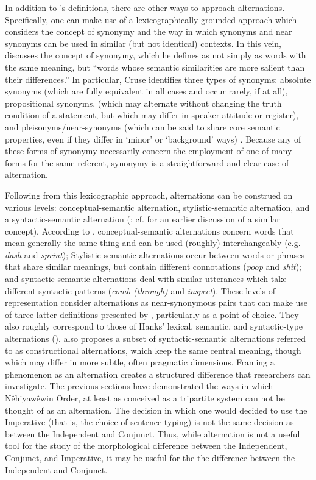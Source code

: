  In addition to \citet{pijpops2020}'s definitions, there are other ways to approach alternations. Specifically, one can make use of a lexicographically grounded approach which considers the concept of synonymy and the way in which synonyms and near synonyms can be used in similar (but not identical) contexts. In this vein, \cite[156]{cruse2001} discusses the concept of synonymy, which he defines as not simply as words with the same meaning, but “words whose semantic similarities are more salient than their differences.” In particular, Cruse identifies three types of synonyms: absolute synonyms (which are fully equivalent in all cases and occur rarely, if at all), propositional synonyms, (which may alternate without changing the truth condition of a statement, but which may differ in speaker attitude or register), and pleisonyms/near-synonyms (which can be said to share core semantic properties, even if they differ in ‘minor’ or ‘background’ ways) \citep[157-159]{cruse2001}. Because any of these forms of synonymy necessarily concern the employment of one of many forms for the same referent, synonymy is a straightforward and clear case of alternation. 

Following from this lexicographic approach, alternations can be construed on various levels: conceptual-semantic alternation, stylistic-semantic alternation, and a syntactic-semantic alternation (\citealt[8]{arppe2008univariate};  cf. \citealt{edmonds2002near} for an earlier discussion of a similar concept). According to \citet[8]{arppe2008univariate}, conceptual-semantic alternations concern words that mean generally the same thing and can be used (roughly) interchangeably (e.g. \textit{dash} and \textit{sprint}); Stylistic-semantic alternations occur between words or phrases that share similar meanings, but contain different connotations (\textit{poop} and \textit{shit}); and syntactic-semantic alternations deal with similar utterances which take different syntactic patterns (\textit{comb (through)} and \textit{inspect}). These levels of representation consider alternations as near-synonymous pairs that can make use of three latter definitions presented by \citet{pijpops2020}, particularly as a point-of-choice. They also roughly correspond to those of Hanks’ lexical, semantic, and syntactic-type alternations (\citeyear[173]{hanks2013lexical}). \citet[10]{arppe2008univariate} also proposes a subset of syntactic-semantic alternations referred to as constructional alternations, which keep the same central meaning, though which may differ in more subtle, often pragmatic dimensions. Framing a phenomenon as an alternation creates a structured difference that researchers can investigate. The previous sections have demonstrated the ways in which Nêhiyawêwin Order, at least as conceived as a tripartite system can not be thought of as an alternation. The decision in which one would decided to use the Imperative (that is, the choice of sentence typing) is not the same decision as between the Independent and Conjunct. Thus, while alternation is not a useful tool for the study of the morphological difference between the Independent, Conjunct, and Imperative, it may be useful for the the difference between the Independent and Conjunct. 

